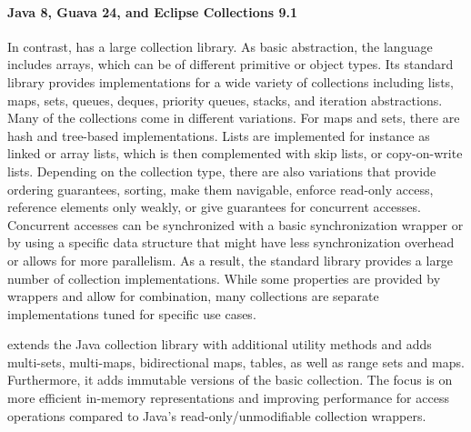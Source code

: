 \documentclass[sigconf, authorversion]{acmart}
\begin{document}
\paragraph{Java 8, Guava 24, and Eclipse Collections 9.1}


In contrast, 
has a large collection library.
As basic abstraction, the language includes arrays,
which can be of different primitive or object types.
Its standard library provides implementations for a wide variety of collections
including lists, maps, sets, queues, deques, priority queues, stacks,
and iteration abstractions.
Many of the collections come in different variations.
For maps and sets, there are hash and tree-based implementations.
Lists are implemented for instance as linked or array lists,
which is then complemented with skip lists, or copy-on-write lists.
Depending on the collection type,
there are also variations that
provide ordering guarantees, sorting, make them navigable,
enforce read-only access, reference elements only weakly,
or give guarantees for concurrent accesses.
Concurrent accesses can be synchronized
with a basic synchronization wrapper
or by using a specific data structure
that might have less synchronization overhead
or allows for more parallelism.
%
As a result,
the standard library provides a large number of collection implementations.
While some properties are provided by wrappers
and allow for combination,
many collections are separate implementations tuned for specific use cases.


extends the Java collection library with additional utility methods
and adds
multi-sets, multi-maps,  bidirectional maps, tables, as well as range sets and maps.
Furthermore, it adds immutable versions of the basic collection.
The focus is on more efficient in-memory representations
and improving performance for access operations
compared to Java's read-only/unmodifiable collection wrappers.
\end{document}
